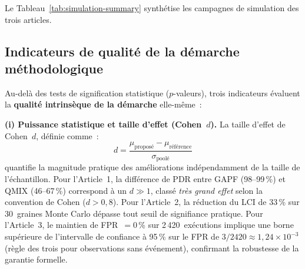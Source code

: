 Le Tableau~\ref{tab:simulation-summary} synthétise les campagnes de simulation des trois articles.

\begin{table}[htbp]
\centering
\caption{Synthèse des campagnes de simulation des trois articles.}
\label{tab:simulation-summary}
\end{table}

\subsection{Indicateurs de qualité de la démarche méthodologique}\label{sec:demarche-qualite}

Au-delà des tests de signification statistique ($p$-valeurs), trois indicateurs évaluent la \textbf{qualité intrinsèque de la démarche} elle-même~:

\noindent\textbf{(i) Puissance statistique et taille d'effet (Cohen~$d$).}
La taille d'effet de Cohen~$d$, définie comme~:
\begin{equation}
d = \frac{\mu_{\text{proposé}} - \mu_{\text{référence}}}{\sigma_{\text{poolé}}}
\label{eq:cohen-d}
\end{equation}
quantifie la magnitude pratique des améliorations indépendamment de la taille de l'échantillon. Pour l'Article~1, la différence de PDR entre GAPF (98--99\,\%) et QMIX (46--67\,\%) correspond à un $d \gg 1$, classé \emph{très grand effet} selon la convention de Cohen ($d > 0{,}8$). Pour l'Article~2, la réduction du LCI de 33\,\% sur 30~graines Monte Carlo dépasse tout seuil de signifiance pratique. Pour l'Article~3, le maintien de FPR~$= 0$\,\% sur 2\,420~exécutions implique une borne supérieure de l'intervalle de confiance à 95\,\% sur le FPR de $3/2420 \approx 1{,}24 \times 10^{-3}$ (règle des trois pour observations sans événement), confirmant la robustesse de la garantie formelle.

